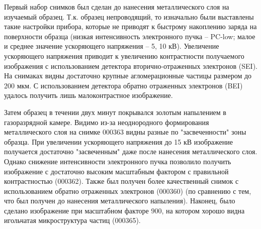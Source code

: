 \documentclass[12pt]{article}
\begin{document}
Первый набор снимков был сделан до нанесения металлического слоя на изучаемый образец. Т.к. образец непроводящий, то изначально были выставлены такие настройки прибора, которые не приводят к быстрому накоплению заряда на поверхности образца (низкая интенсивность электронного пучка -- PC-low; малое и среднее значение ускоряющего напряжения -- 5, 10 кВ). Увеличение ускоряющего напряжения приводит к увеличению контрастности получаемого изображения с использованием детектора вторично-отраженных электронов (SEI). На снимаках видны достаточно крупные агломерационные частицы размером до 200 мкм. С использованием детектора обратно отраженных электронов (BEI) удалось получить лишь малоконтрастное изображение. \par
Затем образец в течении двух минут покрывался золотым напылением в газоразрядной камере. Видимо из-за неоднородного формирования металлического слоя на снимке 000363 видны разные по "засвеченности" зоны образца. При увеличении ускоряющего напряжения до 15 кВ изображение получается достаточно "засвеченным" даже после нанесения металлического слоя. Однако снижение интенсивности электронного пучка позволило получить изображение с достаточно высоким масштабным фактором с правильной контрастностью (000362). Также был получен более качественный снимок с использованием обратно отраженных электронов (000360) (по сравнению с тем, что был получен до нанесения металлического напыления). Наконец, было сделано изображение при масштабном факторе $900$, на котором хорошо видна игольчатая микроструктура частиц (000365). 
\end{document}
